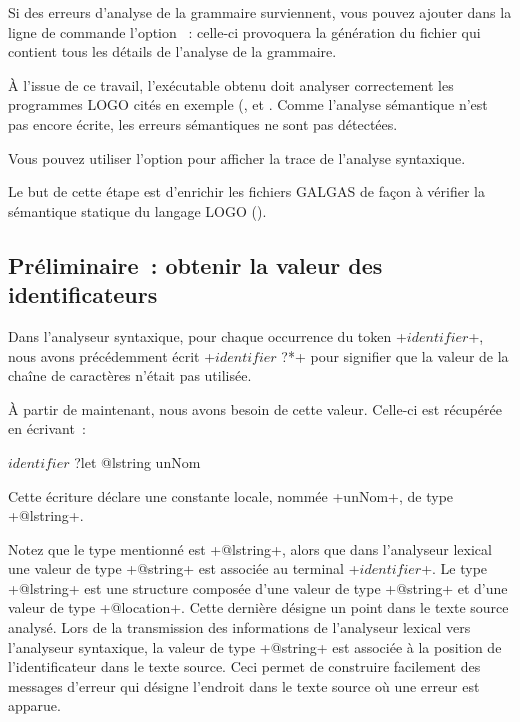 Si des erreurs d'analyse de la grammaire surviennent, vous pouvez ajouter dans la ligne de commande l'option ~: celle-ci provoquera la génération du fichier \- qui contient tous les détails de l'analyse de la grammaire.

À l'issue de ce travail, l'exécutable obtenu doit analyser correctement les programmes LOGO cités en exemple (,   et . Comme l'analyse sémantique n'est pas encore écrite, les erreurs sémantiques ne sont pas détectées.

Vous pouvez utiliser l'option  pour afficher la trace de l'analyse syntaxique.








Le but de cette étape est d'enrichir les fichiers GALGAS de façon à vérifier la sémantique statique du langage LOGO ().

\subsection{Préliminaire~: obtenir la valeur des identificateurs}

Dans l’analyseur syntaxique, pour chaque occurrence du token \ggst+$identifier$+, nous avons précédemment écrit \ggst+$identifier$ ?*+ pour signifier que la valeur de la chaîne de caractères n’était pas utilisée.

À partir de maintenant, nous avons besoin de cette valeur. Celle-ci est récupérée en écrivant~:

\begin{galgas3}
$identifier$ ?let @lstring unNom
\end{galgas3}


Cette écriture déclare une constante locale, nommée \ggst+unNom+, de type \ggst+@lstring+.

Notez que le type mentionné est \ggst+@lstring+, alors que dans l’analyseur lexical une valeur de type \ggst+@string+ est associée au terminal \ggst+$identifier$+. Le type \ggst+@lstring+ est une structure composée d’une valeur de type \ggst+@string+ et d’une valeur de type \ggst+@location+. Cette dernière désigne un point dans le texte source analysé. Lors de la transmission des informations de l’analyseur lexical vers l’analyseur syntaxique, la valeur de type \ggst+@string+ est associée à la position de l’identificateur dans le texte source. Ceci permet de construire facilement des messages d’erreur qui désigne l’endroit dans le texte source où une erreur est apparue.

